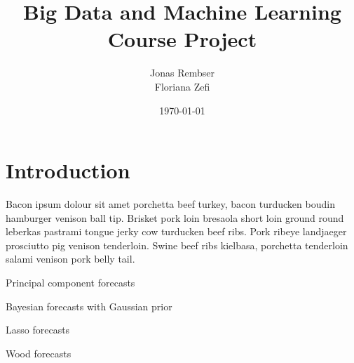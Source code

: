 \documentclass[a4paper,11pt]{scrartcl}
\title{Big Data and Machine Learning \\ Course Project}
\author{Jonas Rembser\\Floriana Zefi}
\date{\today}
\begin{document}
\maketitle

%
\section{Introduction}

Bacon ipsum dolour sit amet porchetta beef turkey, bacon turducken boudin hamburger venison ball tip. Brisket pork loin bresaola short loin ground round leberkas pastrami tongue jerky cow turducken beef ribs. Pork ribeye landjaeger prosciutto pig venison tenderloin. Swine beef ribs kielbasa, porchetta tenderloin salami venison pork belly tail.

\begin{table}[ht]
    \caption{Principal component forecasts}
    \centering
    
    \begin{center}
    
    \end{center}
    \label{table:pc}
\end{table}

\begin{table}[ht]
    \caption{Bayesian forecasts with Gaussian prior}
    \centering
    
    \begin{center}
    
    \end{center}
    \label{table:ridge}
\end{table}

\begin{table}[ht]
    \caption{Lasso forecasts}
    \centering
    
    \begin{center}
    
    \end{center}
    \label{table:lasso}
\end{table}

\begin{table}[ht]
    \caption{Wood forecasts}
    \centering
    
    \begin{center}
    
    \end{center}
    \label{table:wood}
\end{table}


%
%
\end{document}
